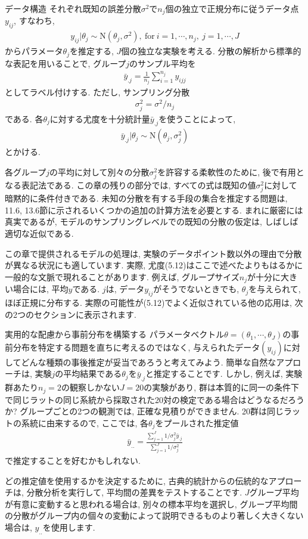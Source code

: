 \documentclass[10pt,dvipdfmx,a4]{beamer}
\newcommand{\eq}[1]{\begin{align}#1\end{align}}
\newcommand{\eqn}[1]{\begin{align*}#1\end{align*}}
\begin{document}

\begin{frame}{データ構造}
それぞれ既知の誤差分散$\sigma^2$で$n_j$個の独立で正規分布に従うデータ点$y_{ij}$, すなわち,
\eq{y_{ij}|\theta_j\sim \text{N}(\theta_j,\sigma^2),\ \text{for}\ i=1,\cdots,n_j,\ j=1,\cdots,J}
からパラメータ$\theta_j$を推定する, $J$個の独立な実験を考える.
分散の解析から標準的な表記を用いることで, グループ$j$のサンプル平均を
\eqn{\bar{y}_{.j}=\frac{1}{n_j}\sum_{i=1}^{n_j} y_{ijj}}
としてラベル付けする.
ただし, サンプリング分散
\eqn{\sigma_j^2=\sigma^2/n_j}
である.
各$\theta_j$に対する尤度を十分統計量$\bar{y}_{.j}$を使うことによって,
\eq{\bar{y}_{.j}|\theta_j\sim\text{N}(\theta_j,\sigma_j^2)}
とかける.
\end{frame}


\begin{frame}
各グループ$j$の平均に対して別々の分散$\sigma^2_j$を許容する柔軟性のために, 後で有用となる表記法である.
この章の残りの部分では, すべての式は既知の値$\sigma^2_j$に対して暗黙的に条件付きである.
未知の分散を有する手段の集合を推定する問題は, 11.6, 13.6節に示されるいくつかの追加の計算方法を必要とする.
まれに厳密には真実であるが, モデルのサンプリングレベルでの既知の分散の仮定は, しばしば適切な近似である.

この章で提供されるモデルの処理は, 実験のデータポイント数以外の理由で分散が異なる状況にも適しています.
実際, 尤度(5.12)はここで述べたよりもはるかに一般的な文脈で現れることがあります.
例えば, グループサイズ$n_j$が十分に大きい場合には, 平均$y$である.
$j$は, データ$y_{ij}$がそうでないときでも, $\theta_j$を与えられて, ほぼ正規に分布する.
実際の可能性が(5.12)でよく近似されている他の応用は, 次の2つのセクションに表示されます.
\end{frame}


\begin{frame}{実用的な配慮から事前分布を構築する}
パラメータベクトル$\theta=(\theta_1,\cdots,\theta_J)$の事前分布を特定する問題を直ちに考えるのではなく, 与えられたデータ$(y_{ij})$に対してどんな種類の事後推定が妥当であろうと考えてみよう.
簡単な自然なアプローチは, 実験$j$の平均結果である$\theta_j$を$\bar{y}_{.j}$と推定することです.
しかし, 例えば, 実験群あたり$n_j=2$の観察しかない$J=20$の実験があり, 群は本質的に同一の条件下で同じラットの同じ系統から採取された20対の検定である場合はどうなるだろうか?
グループごとの2つの観測では, 正確な見積りができません.
20群は同じラットの系統に由来するので, ここでは, 各$\theta_j$をプールされた推定値
\eq{\bar{y}_{..}=\tfrac{\sum_{j=1}^J1/\sigma^2_j\bar{y}_{.j}}{\sum_{j=1}^J1/\sigma_j^2}}
で推定することを好むかもしれない.

どの推定値を使用するかを決定するために, 古典的統計からの伝統的なアプローチは, 分散分析を実行して, 平均間の差異をテストすることです.
$J$グループ平均が有意に変動すると思われる場合は, 別々の標本平均を選択し, グループ平均間の分散がグループ内の個々の変動によって説明できるものより著しく大きくない場合は, $y_{..}$を使用します.
\end{frame}
\end{document}
